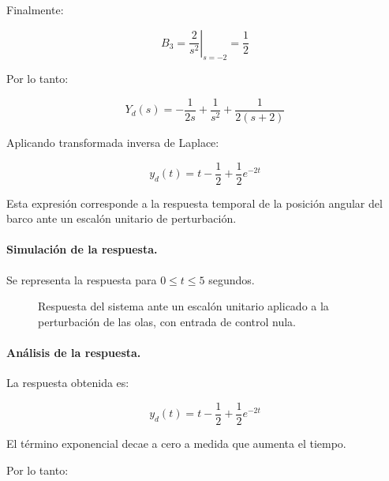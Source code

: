 \documentclass[12pt,a4paper]{article}
\begin{document}
Finalmente:

\begin{equation}B_3=\left. \frac{2}{s^2} \right|_{s=-2}=\frac{1}{2}\end{equation}

Por lo tanto:

\begin{equation}Y_d(s)=-\frac{1}{2s}+\frac{1}{s^2}+\frac{1}{2(s+2)}\end{equation}

Aplicando transformada inversa de Laplace:

\begin{equation}\boxed{y_d(t)=t-\frac{1}{2}+\frac{1}{2}e^{-2t}}\end{equation}

Esta expresión corresponde a la respuesta temporal de la posición angular del barco ante un escalón unitario de perturbación.
\paragraph{Simulación de la respuesta.} Se representa la respuesta para $0\leq t\leq5$ segundos.

\begin{figure}[H]\centering{}\caption{Respuesta del sistema ante un escalón unitario aplicado a la perturbación de las olas, con entrada de control nula.}\end{figure}
\paragraph{Análisis de la respuesta.} La respuesta obtenida es:

\begin{equation}y_d(t)=t-\frac12+\frac12e^{-2t}\end{equation}

El término exponencial decae a cero a medida que aumenta el tiempo.

Por lo tanto:
\end{document}
